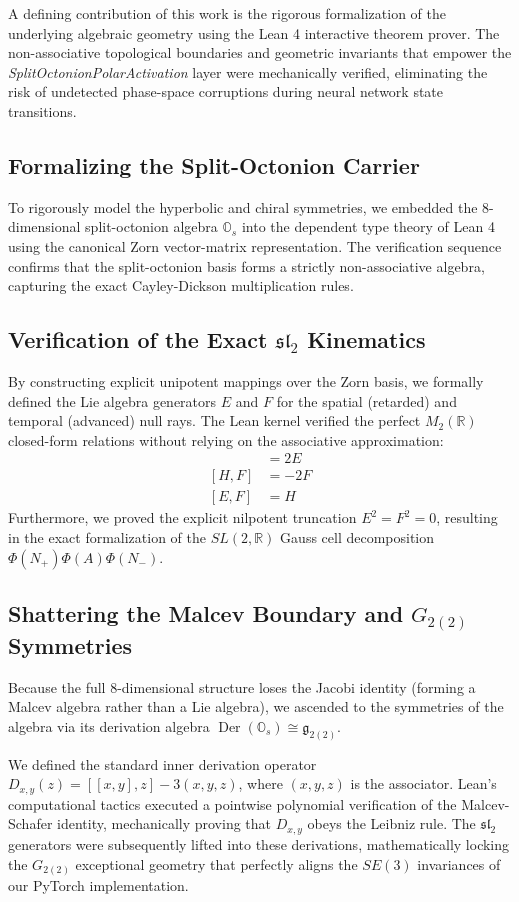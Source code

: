 
A defining contribution of this work is the rigorous formalization of the underlying algebraic geometry using the Lean 4 interactive theorem prover. The non-associative topological boundaries and geometric invariants that empower the \textit{SplitOctonionPolarActivation} layer were mechanically verified, eliminating the risk of undetected phase-space corruptions during neural network state transitions.

\subsection{Formalizing the Split-Octonion Carrier}
To rigorously model the hyperbolic and chiral symmetries, we embedded the $8$-dimensional split-octonion algebra $\mathbb{O}_s$ into the dependent type theory of Lean 4 using the canonical Zorn vector-matrix representation. The verification sequence confirms that the split-octonion basis forms a strictly non-associative algebra, capturing the exact Cayley-Dickson multiplication rules.

\subsection{Verification of the Exact $\mathfrak{sl}_2$ Kinematics}
By constructing explicit unipotent mappings over the Zorn basis, we formally defined the Lie algebra generators $E$ and $F$ for the spatial (retarded) and temporal (advanced) null rays. The Lean kernel verified the perfect $M_2(\mathbb{R})$ closed-form relations without relying on the associative approximation:
\begin{align}
    [H, E] &= 2E \\
    [H, F] &= -2F \\
    [E, F] &= H
\end{align}
Furthermore, we proved the explicit nilpotent truncation $E^2 = F^2 = 0$, resulting in the exact formalization of the $SL(2, \mathbb{R})$ Gauss cell decomposition $\Phi(N_+) \Phi(A) \Phi(N_-)$.

\subsection{Shattering the Malcev Boundary and $G_{2(2)}$ Symmetries}
Because the full $8$-dimensional structure loses the Jacobi identity (forming a Malcev algebra rather than a Lie algebra), we ascended to the symmetries of the algebra via its derivation algebra $\operatorname{Der}(\mathbb{O}_s) \cong \mathfrak{g}_{2(2)}$. 

We defined the standard inner derivation operator $D_{x,y}(z) = [[x,y], z] - 3(x,y,z)$, where $(x,y,z)$ is the associator. Lean's computational tactics executed a pointwise polynomial verification of the Malcev-Schafer identity, mechanically proving that $D_{x,y}$ obeys the Leibniz rule. The $\mathfrak{sl}_2$ generators were subsequently lifted into these derivations, mathematically locking the $G_{2(2)}$ exceptional geometry that perfectly aligns the $SE(3)$ invariances of our PyTorch implementation.
